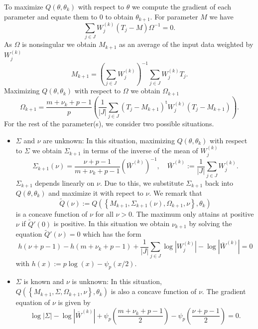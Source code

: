 \documentclass[english,listof=totoc]{scrartcl}
\begin{document}
To maximize $Q(\theta,\theta_k)$ with respect to $\theta$ we compute the gradient of each parameter and equate them to $0$ to obtain $\theta_{k+1}$. For parameter $M$ we have
\begin{equation}
\sum_{j\in J}W_j^{(k)}\left(T_j-M\right)\Omega^{-1}=0.
\end{equation}
As $\Omega$ is nonsingular we obtain $M_{k+1}$ as an average of the input data weighted by $W_j^{(k)}$
\begin{equation}
M_{k+1}=\left(\sum_{j\in J}W_j^{(k)}\right)^{-1}\sum_{j\in J}W_j^{(k)}T_j.\label{eq:M}
\end{equation}
Maximizing $Q(\theta,\theta_k)$ with respect to $\Omega$ we obtain $\Omega_{k+1}$
\begin{equation}
\Omega_{k+1}=\frac{m+\nu_k+p-1}{p}\left(\frac{1}{|J|}\sum_{j\in J}(T_j-M_{k+1})^{\textrm{t}}W_j^{(k)}(T_j-M_{k+1})\right).\label{eq:Omega}
\end{equation}
For the rest of the parameter(s), we consider two possible situations.
\begin{itemize}
\item $\Sigma$ and $\nu$ are unknown: In this situation, maximizing $Q(\theta,\theta_k)$ with respect to $\Sigma$ we obtain $\Sigma_{k+1}$ in terms of the inverse of the mean of $W_j^{{(k)}}$
\begin{equation}
\Sigma_{k+1}(\nu)=\frac{\nu+p-1}{m+\nu_k+p-1}\left(\bar{W}^{(k)}\right)^{-1},\quad \bar{W}^{(k)}:=\frac{1}{|J|}\sum_{j\in J}W_j^{(k)}.\label{eq:Sigma}
\end{equation}
$\Sigma_{k+1}$ depends linearly on $\nu$. Due to this, we substitute $\Sigma_{k+1}$ back into $Q(\theta,\theta_k)$ and maximize it with repect to $\nu$. We remark that
\[\tilde{Q}(\nu):=Q\left(\left\{M_{k+1},\Sigma_{k+1}(\nu),\Omega_{k+1},\nu\right\},\theta_k\right)\]
is a concave function of $\nu$ for all $\nu>0$. The maximum only attains at positive $\nu$ if $\tilde{Q}'(0)$ is positive. In this situation we obtain $\nu_{k+1}$ by solving the equation $\tilde{Q}'(\nu)=0$ which has the form
\begin{equation}
h(\nu+p-1)-h(m+\nu_k+p-1)+\frac{1}{|J|}\sum_{j\in J}\log|W_j^{(k)}|-\log |\bar{W}^{(k)}|=0\label{eq:nu1}
\end{equation}
with $h(x):=p\log(x)-\psi_p(x/2)$.
\item $\Sigma$ is known and $\nu$ is unknown: In this situation, $Q\left(\left\{M_{k+1},\Sigma,\Omega_{k+1},\nu\right\},\theta_k\right)$ is also a concave function of $\nu$. The gradient equation of $\nu$ is given by
\begin{equation}
\log|\Sigma|-\log |\bar{W}^{(k)}|+\psi_{p}\left(\frac{m+\nu_k+p-1}{2}\right)-\psi_{p}\left(\frac{\nu+p-1}{2}\right)=0.\label{eq:nu2}
\end{equation}
\end{itemize}
\end{document}
